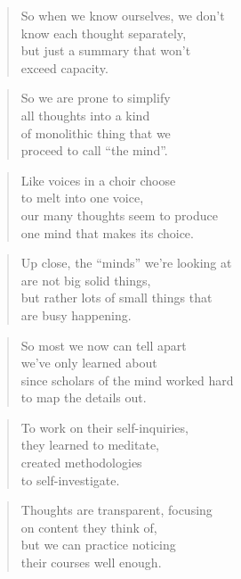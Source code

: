 \documentclass[10pt,a4paper]{article}
\begin{document}
\begin{paracol}{2}
\begin{verse}
So when we know ourselves, we don’t\\
know each thought separately,\\
but just a summary that won’t\\
exceed capacity.
\end{verse}

\begin{verse}
So we are prone to simplify\\
all thoughts into a kind\\
of monolithic thing that we\\
proceed to call “the mind”.
\end{verse}

\begin{verse}
Like voices in a choir choose\\
to melt into one voice,\\
our many thoughts seem to produce\\
one mind that makes its choice.
\end{verse}

\begin{verse}
Up close, the “minds” we’re looking at\\
are not big solid things,\\
but rather lots of small things that\\
are busy happening.
\end{verse}

\begin{verse}
So most we now can tell apart\\
we’ve only learned about\\
since scholars of the mind worked hard\\
to map the details out.
\end{verse}

\begin{verse}
To work on their self-inquiries,\\
they learned to meditate,\\
created methodologies\\
to self-investigate.
\end{verse}

\begin{verse}
Thoughts are transparent, focusing\\
on content they think of,\\
but we can practice noticing\\
their courses well enough.
\end{verse}


\end{paracol}
\end{document}
